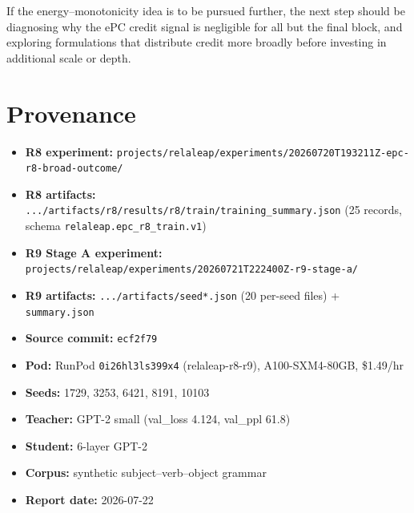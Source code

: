 \documentclass[11pt,a4paper]{article}
\begin{document}
If the energy--monotonicity idea is to be pursued further, the next
step should be diagnosing why the ePC credit signal is negligible for
all but the final block, and exploring formulations that distribute
credit more broadly before investing in additional scale or depth.

\section{Provenance}

\begin{itemize}[nosep]
  \item \textbf{R8 experiment:}
    \texttt{projects/relaleap/experiments/20260720T193211Z-epc-r8-broad-outcome/}
  \item \textbf{R8 artifacts:}
    \texttt{.../artifacts/r8/results/r8/train/training\_summary.json}
    (25 records, schema \texttt{relaleap.epc\_r8\_train.v1})
  \item \textbf{R9 Stage A experiment:}
    \texttt{projects/relaleap/experiments/20260721T222400Z-r9-stage-a/}
  \item \textbf{R9 artifacts:}
    \texttt{.../artifacts/seed*.json} (20 per-seed files) +
    \texttt{summary.json}
  \item \textbf{Source commit:} \texttt{ecf2f79}
  \item \textbf{Pod:} RunPod \texttt{0i26hl3ls399x4} (relaleap-r8-r9),
    A100-SXM4-80GB, \$1.49/hr
  \item \textbf{Seeds:} 1729, 3253, 6421, 8191, 10103
  \item \textbf{Teacher:} GPT-2 small (val\_loss 4.124, val\_ppl 61.8)
  \item \textbf{Student:} 6-layer GPT-2
  \item \textbf{Corpus:} synthetic subject--verb--object grammar
  \item \textbf{Report date:} 2026-07-22
\end{itemize}
\end{document}
